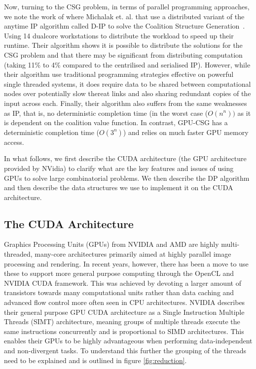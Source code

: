 \documentclass{llncs}
\begin{document}
Now, turning to the CSG problem, in terms of parallel programming approaches, we note the work of where Michalak et. al. that use a distributed variant of the anytime IP algorithm called D-IP to solve the Coalition Structure Generation~\cite{michalak2010distributed}. Using 14 dualcore workstations to distribute the workload to speed up their runtime. Their algorithm  shows it is possible to distribute the solutions for the CSG problem and that there may be significant from distributing computation (taking 11\% to 4\%  compared to the centrilised and serialised IP). However, while their algorithm use traditional programming strategies effective on powerful single threaded systems, it does require data to be shared between computational nodes over potentially slow thereat links and also sharing redundant copies of the input across each. Finally, their algorithm also suffers from the same weaknesses as IP, that is, no deterministic completion time (in the worst case ($O(n^n))$ as it is dependent on the coalition value function. In contrast, GPU-CSG has a deterministic completion time ($O(3^n)$) and relies on much faster GPU memory access.

In what follows, we first describe the CUDA architecture (the GPU architecture provided by NVidia) to clarify what are the key features and issues of using GPUs to solve large combinatorial problems. We then describe the DP algorithm and then describe the data structures we use to implement it on the CUDA architecture.

\subsection{The CUDA Architecture} %
Graphics Processing Units (GPUs) from NVIDIA and AMD are highly multi-threaded, many-core architectures primarily aimed at  highly parallel image processing and rendering. In recent years, however, there has been a move to use these to support more general purpose computing through  the OpenCL and NVIDIA CUDA framework. This was achieved by devoting a larger amount of transistors towards many computational units rather than data caching and advanced  flow control more often seen in CPU architectures. NVIDIA describes their general purpose GPU CUDA architecture as a Single Instruction Multiple Threads (SIMT) architecture,  meaning groups of multiple threads execute the same instructions concurrently and is proportional to SIMD architectures. 
This enables their GPUs to be highly advantageous when performing data-independent and non-divergent tasks. To understand this further the grouping of the threads need to be explained and is outlined in figure \ref{fig:reduction}.
\end{document}

